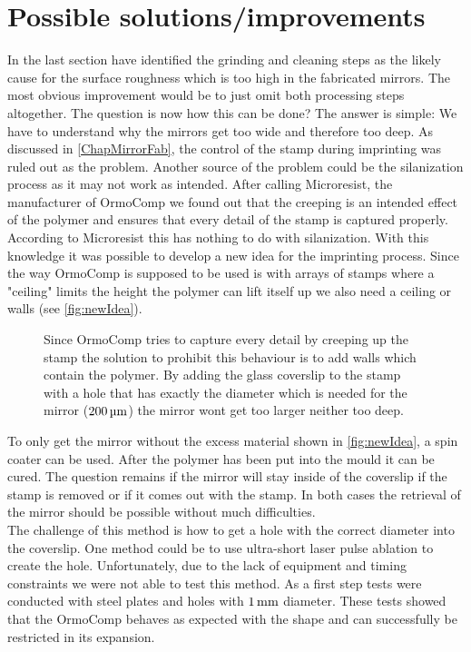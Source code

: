 \section{Possible solutions/improvements}\label{ChapSolutions}
In the last section have identified the grinding and cleaning steps as the likely cause for the surface roughness which is too high in the fabricated mirrors. The most obvious improvement would be to just omit both processing steps altogether. The question is now how this can be done? The answer is simple: We have to understand why the mirrors get too wide and therefore too deep. As discussed in \autoref{ChapMirrorFab}, the control of the stamp during imprinting was ruled out as the problem. Another source of the problem could be the silanization process as it may not work as intended. After calling Microresist, the manufacturer of OrmoComp we found out that the creeping is an intended effect of the polymer and ensures that every detail of the stamp is captured properly. According to Microresist this has nothing to do with silanization.
With this knowledge it was possible to develop a new idea for the imprinting process. Since the way OrmoComp is supposed to be used is with arrays of stamps where a "ceiling" limits the height the polymer can lift itself up we also need a ceiling or walls (see \autoref{fig:newIdea}).

\begin{figure}[H]
	
	\caption{Since OrmoComp tries to capture every detail by creeping up the stamp the solution to prohibit this behaviour is to add walls which contain the polymer. By adding the glass coverslip to the stamp with a hole that has exactly the diameter which is needed for the mirror ($200\um$) the mirror wont get too larger neither too deep.}
	\label{fig:newIdea}
\end{figure}

To only get the mirror without the excess material shown in \autoref{fig:newIdea}, a spin coater can be used. After the polymer has been put into the mould it can be cured. The question remains if the mirror will stay inside of the coverslip if the stamp is removed or if it comes out with the stamp. In both cases the retrieval of the mirror should be possible without much difficulties.\\
The challenge of this method is how to get a hole with the correct diameter into the coverslip. One method could be to use ultra-short laser pulse ablation to create the hole.  Unfortunately, due to the lack of equipment and timing constraints we were not able to test this method. As a first step tests were conducted with steel plates and holes with $1\mm$ diameter. These tests showed that the OrmoComp behaves as expected with the shape and can successfully be restricted in its expansion.